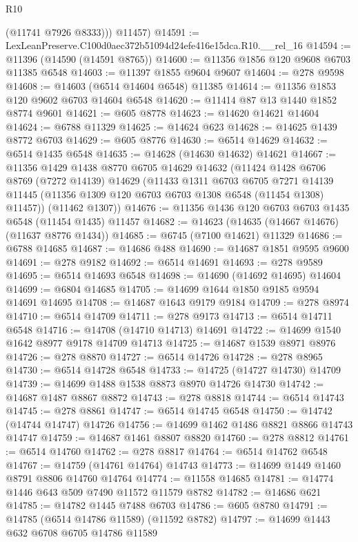 \begin{lexlean}{R10}
\begin{coremodule}
          (@11741 @7926 @8333)))
      @11457)
@14591 := LexLeanPreserve.C100d0aec372b51094d24efe416e15dca.R10.__rel_16
@14594 := @11396 (@14590 (@14591 @8765))
@14600 := @11356 @1856 @120 @9608 @6703 @11385 @6548
@14603 := @11397 @1855 @9604 @9607
@14604 := @278 @9598
@14608 := @14603 (@6514 @14604 @6548) @11385
@14614 := @11356 @1853 @120 @9602 @6703 @14604 @6548
@14620 := @11414 @87 @13 @1440 @1852 @8774 @9601
@14621 := @605 @8778
@14623 := @14620 @14621 @14604
@14624 := @6788 @11329
@14625 := @14624 @623
@14628 := @14625 @1439 @8772 @6703
@14629 := @605 @8776
@14630 := @6514 @14629
@14632 := @6514 @1435 @6548
@14635 := @14628 (@14630 @14632) @14621
@14667 := @11356
    @1429
    @1438
    @8770
    @6705
    @14629
    @14632
    (@11424
      @1428
      @6706
      @8769
      (@7272 @14139)
      @14629
      (@11433
        @1311
        @6703
        @6705
        @7271
        @14139
        @11445
        (@11356 @1309 @120 @6703 @6703 @1308 @6548 (@11454 @1308) @11457))
      (@11462 @1307))
@14676 := @11356 @1436 @120 @6703 @6703 @1435 @6548 (@11454 @1435) @11457
@14682 := @14623 (@14635 (@14667 @14676) (@11637 @8776 @1434))
@14685 := @6745 (@7100 @14621) @11329
@14686 := @6788 @14685
@14687 := @14686 @488
@14690 := @14687 @1851 @9595 @9600
@14691 := @278 @9182
@14692 := @6514 @14691
@14693 := @278 @9589
@14695 := @6514 @14693 @6548
@14698 := @14690 (@14692 @14695) @14604
@14699 := @6804 @14685
@14705 := @14699 @1644 @1850 @9185 @9594 @14691 @14695
@14708 := @14687 @1643 @9179 @9184
@14709 := @278 @8974
@14710 := @6514 @14709
@14711 := @278 @9173
@14713 := @6514 @14711 @6548
@14716 := @14708 (@14710 @14713) @14691
@14722 := @14699 @1540 @1642 @8977 @9178 @14709 @14713
@14725 := @14687 @1539 @8971 @8976
@14726 := @278 @8870
@14727 := @6514 @14726
@14728 := @278 @8965
@14730 := @6514 @14728 @6548
@14733 := @14725 (@14727 @14730) @14709
@14739 := @14699 @1488 @1538 @8873 @8970 @14726 @14730
@14742 := @14687 @1487 @8867 @8872
@14743 := @278 @8818
@14744 := @6514 @14743
@14745 := @278 @8861
@14747 := @6514 @14745 @6548
@14750 := @14742 (@14744 @14747) @14726
@14756 := @14699 @1462 @1486 @8821 @8866 @14743 @14747
@14759 := @14687 @1461 @8807 @8820
@14760 := @278 @8812
@14761 := @6514 @14760
@14762 := @278 @8817
@14764 := @6514 @14762 @6548
@14767 := @14759 (@14761 @14764) @14743
@14773 := @14699 @1449 @1460 @8791 @8806 @14760 @14764
@14774 := @11558 @14685
@14781 := @14774 @1446 @643 @509 @7490 @11572 @11579 @8782
@14782 := @14686 @621
@14785 := @14782 @1445 @7488 @6703
@14786 := @605 @8780
@14791 := @14785 (@6514 @14786 @11589) (@11592 @8782)
@14797 := @14699 @1443 @632 @6708 @6705 @14786 @11589

\end{coremodule}
\end{lexlean}
